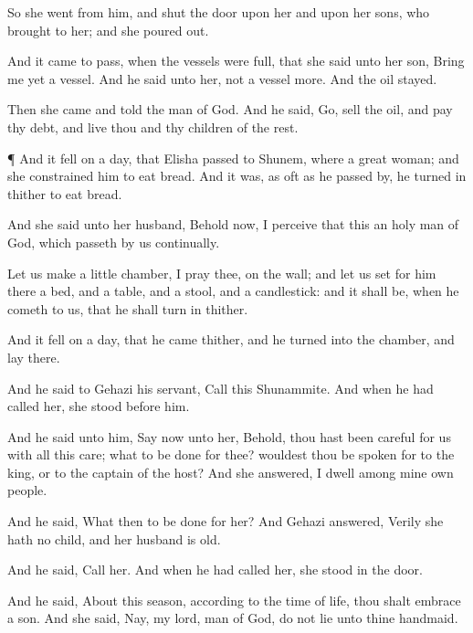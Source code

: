 {So she
went from him, and
shut the
door upon her and
upon her
sons,
who
brought
{} to her; and she poured
out.

And it came to pass, when the
vessels were
full, that she
said unto her
son,
Bring me yet a
vessel. And he
said unto her,
{} not a
vessel more. And the
oil
stayed.

Then she
came and
told the
man of
God. And he
said,
Go,
sell the
oil, and
pay thy
debt, and
live thou and thy
children of the
rest.


\par }{\PP {}¶ And it fell on a
day, that
Elisha
passed to
Shunem, where
{} a
great
woman; and she
constrained him to
eat
bread. And
{} it was,
{} as
oft as he passed
by, he
turned in thither to
eat
bread.

And she
said unto her
husband, Behold now, I
perceive that this
{} an
holy
man of
God, which
passeth by us
continually.

Let us
make a
little
chamber, I pray thee, on the
wall; and let us
set for him there a
bed, and a
table, and a
stool, and a
candlestick: and it shall be, when he
cometh to us, that he shall
turn in thither.

And it fell on a
day, that he
came thither, and he
turned into the
chamber, and
lay there.

And he
said to
Gehazi his
servant,
Call this
Shunammite. And when he had
called her, she
stood
before him.

And he
said unto him,
Say now unto her, Behold, thou hast been
careful for us with all this
care; what
{} to be
done for thee?
wouldest thou be
spoken for to the
king, or to the
captain of the
host? And she
answered, I
dwell
among mine own
people.

And he
said, What then
{} to be
done for her? And
Gehazi
answered,
Verily she hath no
child, and her
husband is
old.

And he
said,
Call her. And when he had
called her, she
stood in the
door.

And he
said, About this
season, according to the
time of
life, thou shalt
embrace a
son. And she
said, Nay, my
lord,
{}
man of
God, do not
lie unto thine
handmaid.

}
